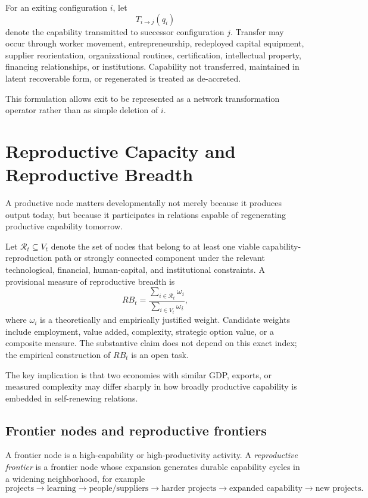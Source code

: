\documentclass[11pt]{article}
\begin{document}
For an exiting configuration $i$, let
\[
T_{i\to j}(q_i)
\]
denote the capability transmitted to successor configuration $j$. Transfer may occur through worker movement, entrepreneurship, redeployed capital equipment, supplier reorientation, organizational routines, certification, intellectual property, financing relationships, or institutions. Capability not transferred, maintained in latent recoverable form, or regenerated is treated as de-accreted.

This formulation allows exit to be represented as a network transformation operator rather than as simple deletion of $i$.

\section{Reproductive Capacity and Reproductive Breadth}

A productive node matters developmentally not merely because it produces output today, but because it participates in relations capable of regenerating productive capability tomorrow.

Let $\mathcal{R}_t\subseteq V_t$ denote the set of nodes that belong to at least one viable capability-reproduction path or strongly connected component under the relevant technological, financial, human-capital, and institutional constraints. A provisional measure of reproductive breadth is
\[
RB_t = \frac{\sum_{i\in\mathcal{R}_t}\omega_i}{\sum_{i\in V_t}\omega_i},
\]
where $\omega_i$ is a theoretically and empirically justified weight. Candidate weights include employment, value added, complexity, strategic option value, or a composite measure. The substantive claim does not depend on this exact index; the empirical construction of $RB_t$ is an open task.

The key implication is that two economies with similar GDP, exports, or measured complexity may differ sharply in how broadly productive capability is embedded in self-renewing relations.

\subsection{Frontier nodes and reproductive frontiers}

A frontier node is a high-capability or high-productivity activity. A \emph{reproductive frontier} is a frontier node whose expansion generates durable capability cycles in a widening neighborhood, for example
\[
\text{projects}\rightarrow\text{learning}\rightarrow\text{people/suppliers}
\rightarrow\text{harder projects}\rightarrow\text{expanded capability}\rightarrow\text{new projects}.
\]
\end{document}
